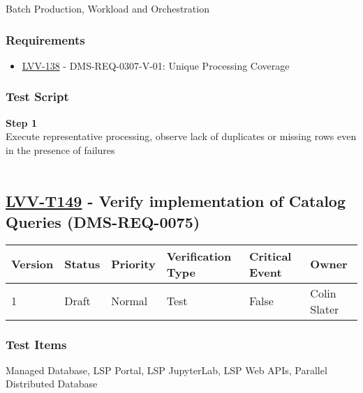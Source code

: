 Batch Production, Workload and Orchestration~

\hypertarget{requirements-125}{%
\subsubsection{Requirements}\label{requirements-125}}

\begin{itemize}
\tightlist
\item
  \href{https://jira.lsstcorp.org/browse/LVV-138}{LVV-138} -
  DMS-REQ-0307-V-01: Unique Processing Coverage
\end{itemize}

\hypertarget{test-script-125}{%
\subsubsection{Test Script}\label{test-script-125}}

\textbf{Step 1}\\
Execute representative processing, observe lack of duplicates or missing
rows even in the presence of failures\\
~\\

\hypertarget{lvv-t149---verify-implementation-of-catalog-queries-dms-req-0075}{%
\subsection{\texorpdfstring{\href{https://jira.lsstcorp.org/secure/Tests.jspa\#/testCase/LVV-T149}{LVV-T149}
- Verify implementation of Catalog Queries
(DMS-REQ-0075)}{LVV-T149 - Verify implementation of Catalog Queries (DMS-REQ-0075)}}\label{lvv-t149---verify-implementation-of-catalog-queries-dms-req-0075}}

\begin{longtable}[]{@{}llllll@{}}
\toprule
Version & Status & Priority & Verification Type & Critical Event &
Owner\tabularnewline
\midrule
\endhead
1 & Draft & Normal & Test & False & Colin Slater\tabularnewline
\bottomrule
\end{longtable}

\hypertarget{test-items-125}{%
\subsubsection{Test Items}\label{test-items-125}}

Managed Database, LSP Portal, LSP JupyterLab, LSP Web APIs, Parallel
Distributed Database

